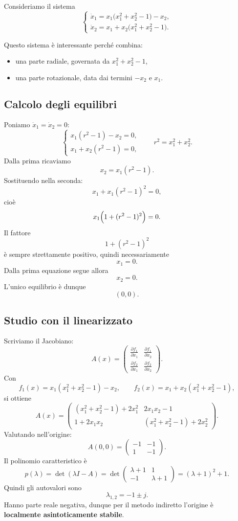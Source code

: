 Consideriamo il sistema
\begin{equation}
\label{eq:L22-sistema-rotazione}
\begin{cases}
\dot x_1 = x_1\bigl(x_1^2+x_2^2-1\bigr)-x_2,\\[4pt]
\dot x_2 = x_1+x_2\bigl(x_1^2+x_2^2-1\bigr).
\end{cases}
\end{equation}

Questo sistema è interessante perché combina:
\begin{itemize}
    \item una parte radiale, governata da \(x_1^2+x_2^2-1\),
    \item una parte rotazionale, data dai termini \(-x_2\) e \(x_1\).
\end{itemize}

\subsection{Calcolo degli equilibri}

Poniamo \(\dot x_1=\dot x_2=0\):
\[
\begin{cases}
x_1(r^2-1)-x_2=0,\\
x_1+x_2(r^2-1)=0,
\end{cases}
\qquad r^2=x_1^2+x_2^2.
\]
Dalla prima ricaviamo
\[
x_2=x_1(r^2-1).
\]
Sostituendo nella seconda:
\[
x_1 + x_1(r^2-1)^2 = 0,
\]
cioè
\[
x_1\Bigl(1+(r^2-1)^2\Bigr)=0.
\]
Il fattore
\[
1+(r^2-1)^2
\]
è sempre strettamente positivo, quindi necessariamente
\[
x_1=0.
\]
Dalla prima equazione segue allora
\[
x_2=0.
\]
L'unico equilibrio è dunque
\[
(0,0).
\]

\subsection{Studio con il linearizzato}

Scriviamo il Jacobiano:
\[
A(x)=
\begin{pmatrix}
\frac{\partial f_1}{\partial x_1} & \frac{\partial f_1}{\partial x_2}\\[4pt]
\frac{\partial f_2}{\partial x_1} & \frac{\partial f_2}{\partial x_2}
\end{pmatrix}.
\]
Con
\[
f_1(x)=x_1(x_1^2+x_2^2-1)-x_2,
\qquad
f_2(x)=x_1+x_2(x_1^2+x_2^2-1),
\]
si ottiene
\[
A(x)=
\begin{pmatrix}
(x_1^2+x_2^2-1)+2x_1^2 & 2x_1x_2-1\\[4pt]
1+2x_1x_2 & (x_1^2+x_2^2-1)+2x_2^2
\end{pmatrix}.
\]
Valutando nell'origine:
\[
A(0,0)=
\begin{pmatrix}
-1 & -1\\
1 & -1
\end{pmatrix}.
\]
Il polinomio caratteristico è
\[
p(\lambda)=\det(\lambda I-A)=
\det\begin{pmatrix}
\lambda+1 & 1\\
-1 & \lambda+1
\end{pmatrix}
=(\lambda+1)^2+1.
\]
Quindi gli autovalori sono
\[
\lambda_{1,2}=-1\pm j.
\]
Hanno parte reale negativa, dunque per il metodo indiretto l'origine è \textbf{localmente asintoticamente stabile}.

